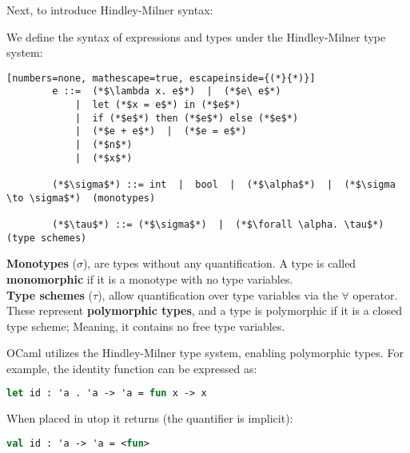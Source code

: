 \noindent
Next, to introduce Hindley-Milner syntax: 
\begin{Def}

    We define the syntax of expressions and types under the Hindley-Milner type system:
    
    \begin{lstlisting}[numbers=none, mathescape=true, escapeinside={(*}{*)}]
        e ::=  (*$\lambda x. e$*)  |  (*$e\ e$*) 
            |  let (*$x = e$*) in (*$e$*) 
            |  if (*$e$*) then (*$e$*) else (*$e$*) 
            |  (*$e + e$*)  |  (*$e = e$*) 
            |  (*$n$*) 
            |  (*$x$*)

        (*$\sigma$*) ::= int  |  bool  |  (*$\alpha$*)  |  (*$\sigma \to \sigma$*)  (monotypes)
        
        (*$\tau$*) ::= (*$\sigma$*)  |  (*$\forall \alpha. \tau$*)                    (type schemes)
    \end{lstlisting}
    
    \noindent
    \textbf{Monotypes} ($\sigma$), are types without any quantification. A type is called \textbf{monomorphic} if it is a monotype
    with no type variables.\\
    
    \noindent
    \textbf{Type schemes} ($\tau$), allow quantification over type variables via the $\forall$ operator. These represent \textbf{polymorphic types}, and a type is polymorphic if it is a closed type scheme; Meaning,
    it contains no free type variables.
    
    \end{Def}

\begin{Example}

    OCaml utilizes the Hindley-Milner type system, enabling polymorphic types. For example, the identity function can be expressed as:
    \begin{lstlisting}[language=OCaml, numbers=none]
        let id : 'a . 'a -> 'a = fun x -> x
    \end{lstlisting}
    
    \noindent
    When placed in utop it returns (the quantifier is implicit):
    \begin{lstlisting}[language=OCaml, numbers=none]
        val id : 'a -> 'a = <fun>
    \end{lstlisting}
\end{Example}
    
